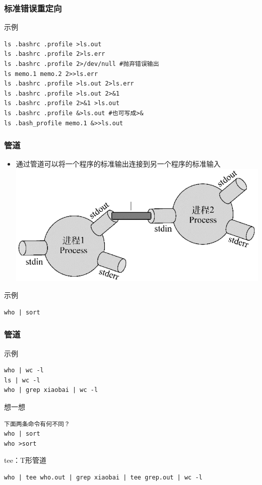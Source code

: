 \documentclass[xcolor=svgnames,presentation]{beamer}
\begin{document}
\begin{frame}[fragile]
\frametitle{标准错误重定向}
\label{sec-2-1-6}
\begin{exampleblock}{示例}
\label{sec-2-1-6-1}


\begin{verbatim}
ls .bashrc .profile >ls.out
ls .bashrc .profile 2>ls.err
ls .bashrc .profile 2>/dev/null #抛弃错误输出
ls memo.1 memo.2 2>>ls.err
ls .bashrc .profile >ls.out 2>ls.err
ls .bashrc .profile >ls.out 2>&1
ls .bashrc .profile 2>&1 >ls.out
ls .bashrc .profile &>ls.out #也可写成>&
ls .bash_profile memo.1 &>>ls.out
\end{verbatim}
\end{exampleblock}
\end{frame}
\begin{frame}[fragile]
\frametitle{管道}
\label{sec-2-1-7}
\begin{itemize}

\item 通过管道可以将一个程序的标准输出连接到另一个程序的标准输入\\
\label{sec-2-1-7-1}%
\includegraphics[width=.9\linewidth]{img/pipe.png}
\end{itemize} %
\begin{exampleblock}{示例}
\label{sec-2-1-7-2}


\begin{verbatim}
who | sort
\end{verbatim}
\end{exampleblock}
\end{frame}
\begin{frame}[fragile]
\frametitle{管道}
\label{sec-2-1-8}
\begin{exampleblock}{示例}
\label{sec-2-1-8-1}


\begin{verbatim}
who | wc -l
ls | wc -l
who | grep xiaobai | wc -l
\end{verbatim}
\end{exampleblock}
\begin{block}{想一想}
\label{sec-2-1-8-2}


\begin{verbatim}
下面两条命令有何不同？
who | sort
who >sort
\end{verbatim}
\end{block}
\begin{exampleblock}{tee：T形管道}
\label{sec-2-1-8-3}


\begin{verbatim}
who | tee who.out | grep xiaobai | tee grep.out | wc -l
\end{verbatim}
\end{exampleblock}
\end{frame}
\end{document}

